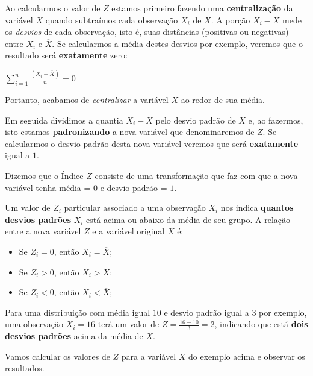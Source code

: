 \documentclass[
]{book}
\providecommand{\tightlist}{%
  \setlength{\itemsep}{0pt}\setlength{\parskip}{0pt}}
\begin{document}
Ao calcularmos o valor de \(Z\) estamos primeiro fazendo uma \textbf{centralização} da variável \(X\) quando subtraímos cada observação \(X_i\) de \(\overline{X}\). A porção \(X_i - \overline{X}\) mede os \emph{desvios} de cada observação, isto é, suas distâncias (positivas ou negativas) entre \(X_i\) e \(\overline{X}\). Se calcularmos a média destes desvios por exemplo, veremos que o resultado será \textbf{exatamente} zero:

\(\sum_{i=1}^{n}\frac{(X_i - \overline{X})}{n} = 0\)

Portanto, acabamos de \emph{centralizar} a variável \(X\) ao redor de sua média.

Em seguida dividimos a quantia \(X_i - \overline{X}\) pelo desvio padrão de \(X\) e, ao fazermos, isto estamos \textbf{padronizando} a nova variável que denominaremos de \(Z\). Se calcularmos o desvio padrão desta nova variável veremos que será \textbf{exatamente} igual a \(1\).

Dizemos que o Índice \(Z\) consiste de uma transformação que faz com que a nova variável tenha média = \(0\) e desvio padrão = \(1\).

Um valor de \(Z_i\) particular associado a uma observação \(X_i\) nos indica \textbf{quantos desvios padrões} \(X_i\) está acima ou abaixo da média de seu grupo. A relação entre a nova variável \(Z\) e a variável original \(X\) é:

\begin{itemize}
\tightlist
\item
  Se \(Z_i = 0\), então \(X_i = \overline{X}\);
\item
  Se \(Z_i > 0\), então \(X_i > \overline{X}\);
\item
  Se \(Z_i < 0\), então \(X_i < \overline{X}\);
\end{itemize}

Para uma distribuição com média igual \(10\) e desvio padrão igual a \(3\) por exemplo, uma observação \(X_i = 16\) terá um valor de \(Z = \frac{16-10}{3} = 2\), indicando que está \textbf{dois desvios padrões} acima da média de \(X\).

Vamos calcular os valores de \(Z\) para a variável \(X\) do exemplo acima e observar os resultados.
\end{document}
